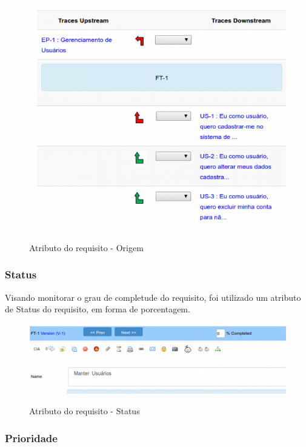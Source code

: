 \FloatBarrier
\begin{figure}[!htpd]
		\centering
		\includegraphics[scale=0.4]{figuras/origem}
		\label{img:origem}
		\caption{Atributo do requisito - Origem}
\end{figure}

\subsubsection{Status}

Visando monitorar o grau de completude do requisito, foi utilizado um atributo de Status do requisito, em forma de porcentagem.

\FloatBarrier
\begin{figure}[!htpd]
		\centering
		\includegraphics[scale=0.4]{figuras/status}
		\label{img:status}
		\caption{Atributo do requisito - Status}
\end{figure}

\subsubsection{Prioridade}

